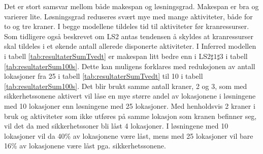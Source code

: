 Det er stort samsvar mellom både makespan og løsningsgrad. Makespan er bra og varierer lite. Løsningsgrad reduseres svært mye med mange aktiviteter, både for to og tre kraner. I begge modellene tildeles tid til aktiviteter før kranressurser. Som tidligere også beskrevet om LS2 antas tendensen å skyldes at kranressurser skal tildeles i et økende antall allerede disponerte aktiviteter. I Inferred modellen i tabell \ref{tab:resultaterSumTvedt} er makespan litt bedre enn i LS2$\sharp1\sharp3$ i tabell \ref{tab:resultaterSum100s}. Dette kan muligens forklares med reduksjonen av antall lokasjoner fra 25 i tabell \ref{tab:resultaterSumTvedt} til 10 i tabell \ref{tab:resultaterSum100s}. Det blir brukt samme antall kraner, 2 og 3, som med sikkerhetssonene aktivert vil låse en mye større andel av lokasjonene i løsningene med 10 lokasjoner enn løsningene med 25 lokasjoner. Med henholdsvis 2 kraner i bruk og aktiviteter som ikke utføres på samme lokasjon som kranen befinner seg, vil det da med sikkerhetssoner bli låst 4 lokasjoner. I løsningene med 10 lokasjoner vil da 40\% av lokasjonene være låst, mens med 25 lokasjoner vil bare 16\% av lokasjonene være låst pga. sikkerhetssonene.